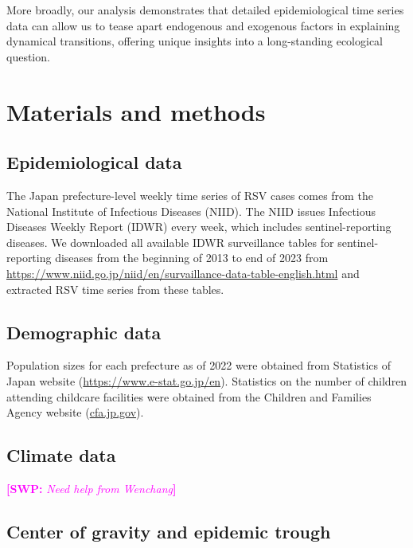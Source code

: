 \documentclass[12pt]{article}
\newcommand{\comment}{\showcomment}
\newcommand{\showcomment}[3]{\textcolor{#1}{\textbf{[#2: }\textsl{#3}\textbf{]}}}
\newcommand{\swp}[1]{\comment{magenta}{SWP}{#1}}
\begin{document}
More broadly, our analysis demonstrates that detailed epidemiological time series data can allow us to tease apart endogenous and exogenous factors in explaining dynamical transitions, offering unique insights into a long-standing ecological question.

\section*{Materials and methods}

\subsection*{Epidemiological data}

The Japan prefecture-level weekly time series of RSV cases comes from the National Institute of Infectious Diseases (NIID).
The NIID issues Infectious Diseases Weekly Report (IDWR) every week, which includes sentinel-reporting diseases.
We downloaded all available IDWR surveillance tables for sentinel-reporting diseases from the beginning of 2013 to end of 2023 from \url{https://www.niid.go.jp/niid/en/survaillance-data-table-english.html} and extracted RSV time series from these tables.

\subsection*{Demographic data}

Population sizes for each prefecture as of 2022 were obtained from Statistics of Japan website (\url{https://www.e-stat.go.jp/en}).
Statistics on the number of children attending childcare facilities were obtained from the Children and Families Agency website (\url{cfa.jp.gov}).

\subsection*{Climate data}

\swp{Need help from Wenchang}

\subsection*{Center of gravity and epidemic trough}
\end{document}
